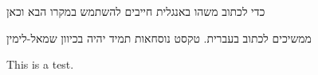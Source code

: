 \documentclass{article}
\begin{document}

 כדי לכתוב משהו באנגלית חייבים להשתמש במקרו הבא וכאן

 ממשיכים לכתוב בעברית. טקסט נוסחאות תמיד יהיה בכיוון שמאל-לימין

This is a test.
\end{document}
